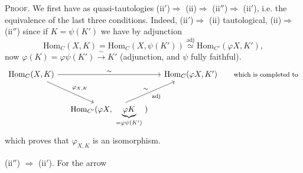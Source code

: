 \textsc{Proof.} We first have as quasi-tautologies (ii$'$)$\Longrightarrow$ (ii)$\Longrightarrow$ (ii$''$)$\Longrightarrow$ (ii$'$), i.e. the equivalence of the last three conditions. Indeed, (ii$'$)$\Longrightarrow$ (ii) tautological, (ii)$\Longrightarrow$ (ii$''$) since if $K=\psi(K')$ we have %
by adjunction
\[
\mathrm{Hom}_C(X,K)=\mathrm{Hom}_C(X,\psi(K'))\overset{\text{adj}}{\simeq}\mathrm{Hom}_{C'}(\varphi X,K'),
\]
now $\varphi(K)=\varphi\psi(K')\xrightarrow{\ \sim\ }K'$ (adjunction, and $\psi$ fully faithful).
\[
\begin{tikzcd}[column sep=small, row sep=large]
\mathrm{Hom}_C(X,K) \arrow[rr, "\sim"] \arrow[dr, "\varphi_{X,K}"] & & \mathrm{Hom}_C(\varphi X,K') & \text{\footnotesize which is completed to} \\ %
& \mathrm{Hom}_{C'}(\varphi X,\ \underbrace{\varphi K}_{=\varphi\psi(K')}\ ) \arrow[ur, "\sim", "\text{adj}"'] & &
\end{tikzcd}
\]
which proves that $\varphi_{X,K}$ is an isomorphism.

(ii$''$) $\Longrightarrow$ (ii$'$). For the arrow
